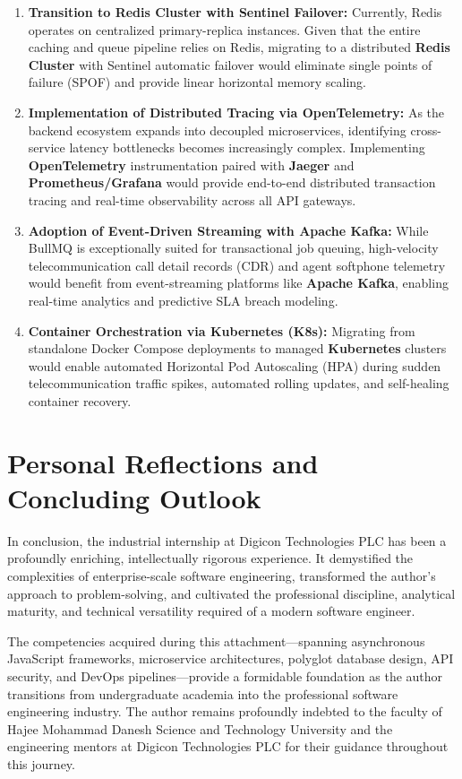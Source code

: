 \begin{enumerate}
    \item \textbf{Transition to Redis Cluster with Sentinel Failover:} Currently, Redis operates on centralized primary-replica instances. Given that the entire caching and queue pipeline relies on Redis, migrating to a distributed \textbf{Redis Cluster} with Sentinel automatic failover would eliminate single points of failure (SPOF) and provide linear horizontal memory scaling.
    \item \textbf{Implementation of Distributed Tracing via OpenTelemetry:} As the backend ecosystem expands into decoupled microservices, identifying cross-service latency bottlenecks becomes increasingly complex. Implementing \textbf{OpenTelemetry} instrumentation paired with \textbf{Jaeger} and \textbf{Prometheus/Grafana} would provide end-to-end distributed transaction tracing and real-time observability across all API gateways.
    \item \textbf{Adoption of Event-Driven Streaming with Apache Kafka:} While BullMQ is exceptionally suited for transactional job queuing, high-velocity telecommunication call detail records (CDR) and agent softphone telemetry would benefit from event-streaming platforms like \textbf{Apache Kafka}, enabling real-time analytics and predictive SLA breach modeling.
    \item \textbf{Container Orchestration via Kubernetes (K8s):} Migrating from standalone Docker Compose deployments to managed \textbf{Kubernetes} clusters would enable automated Horizontal Pod Autoscaling (HPA) during sudden telecommunication traffic spikes, automated rolling updates, and self-healing container recovery.
\end{enumerate}

\section{Personal Reflections and Concluding Outlook}
\label{sec:conclusion_outlook}

In conclusion, the industrial internship at Digicon Technologies PLC has been a profoundly enriching, intellectually rigorous experience. It demystified the complexities of enterprise-scale software engineering, transformed the author's approach to problem-solving, and cultivated the professional discipline, analytical maturity, and technical versatility required of a modern software engineer.

The competencies acquired during this attachment—spanning asynchronous JavaScript frameworks, microservice architectures, polyglot database design, API security, and DevOps pipelines—provide a formidable foundation as the author transitions from undergraduate academia into the professional software engineering industry. The author remains profoundly indebted to the faculty of Hajee Mohammad Danesh Science and Technology University and the engineering mentors at Digicon Technologies PLC for their guidance throughout this journey.
